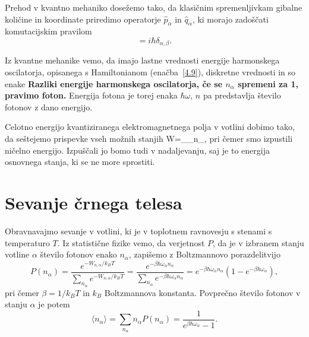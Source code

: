 Prehod v kvantno mehaniko dosežemo tako, da klasičnim spremenljivkam gibalne količine
in koordinate priredimo operatorje $\hat{p}_{\alpha}$ in $\hat{q}_{\alpha}$,
ki morajo zadoščati komutacijskim pravilom 
\begin{equation}
[\hat{q}_{\alpha},\hat{p}_{\beta}]=i\hbar \delta_{\alpha, \beta}.
\label{4.10}
\end{equation}

Iz kvantne mehanike vemo, da imajo lastne vrednosti energije harmonskega oscilatorja, 
opisanega s Hamiltonianom (enačba~\ref{4.9}), diskretne vrednosti in so enake
{\bf Razliki energije harmonskega oscilatorja, če se $n_{\alpha}$
spremeni za 1, pravimo foton.} Energija
fotona je torej enaka $\hbar \omega$, $n$ pa predstavlja število fotonov z dano energijo. 

Celotno energijo kvantiziranega elektromagnetnega polja v votlini
dobimo tako, da seštejemo prispevke vseh možnih stanjih
\beq
W=\sum_{\alpha}\hbar\omega_{\alpha}n_{\alpha},
\eeq
pri čemer smo izpustili ničelno energijo. Izpuščali jo bomo tudi v nadaljevanju, saj
je to energija osnovnega stanja, ki se ne more sprostiti. 

\section{Sevanje črnega telesa}
Obravnavajmo sevanje v votlini, ki je v toplotnem ravnovesju s stenami s temperaturo
$T$. Iz statistične fizike vemo, da verjetnost $P$, da je v izbranem stanju 
votline $\alpha$ število fotonov enako $n_{\alpha}$, zapišemo z Boltzmannovo porazdelitvijo
\begin{equation}
P(n_{\alpha})=\frac{e^{-W_{n,\alpha}/k_BT}}{\sum_{n_{\alpha}}e^{-W_{n,\alpha}/k_BT}} = 
\frac{e^{-\beta\hbar\omega_{\alpha}n_{\alpha}}}
{\sum_{n_{\alpha}}e^{-\beta\hbar\omega_{\alpha}n_{\alpha}}}=
e^{-\beta\hbar\omega_{\alpha}n_{\alpha}}(1-e^{-\beta\hbar\omega_{\alpha}}),
\label{4.12}
\end{equation}
pri čemer $\beta = 1/k_BT$ in $k_B$ Boltzmannova konstanta. Povprečno število fotonov 
v stanju $\alpha$ je potem
\begin{equation}
\langle n_{\alpha}\rangle =\sum_{n_{\alpha}}n_{\alpha}P(n_{\alpha})=\frac{1}{e^{\beta\hbar\omega_{\alpha}}-1}.
\label{4.13}
\end{equation}

